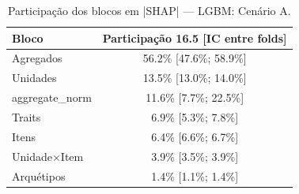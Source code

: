 \begin{table}[htbp]
\caption{Participação dos blocos em |SHAP| — LGBM: Cenário A.}
\label{tab:blklgbm_A}
\centering
\small
\begin{tabular}{lc}
\toprule
Bloco & Participação 16.5 [IC entre folds] \\
\midrule
Agregados & 56.2\% [47.6\%; 58.9\%] \\
Unidades & 13.5\% [13.0\%; 14.0\%] \\
aggregate\_norm & 11.6\% [7.7\%; 22.5\%] \\
Traits & 6.9\% [5.3\%; 7.8\%] \\
Itens & 6.4\% [6.6\%; 6.7\%] \\
Unidade×Item & 3.9\% [3.5\%; 3.9\%] \\
Arquétipos & 1.4\% [1.1\%; 1.4\%] \\
\bottomrule
\end{tabular}
\end{table}
